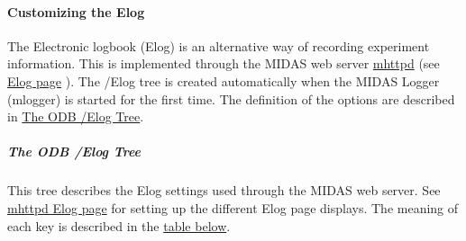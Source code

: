 \par
 

 \par
\hypertarget{F_Elog_F_Elog_Custom}{}\paragraph{Customizing the Elog}\label{F_Elog_F_Elog_Custom}
The Electronic logbook (Elog) is an alternative way of recording experiment information. This is implemented through the MIDAS web server \hyperlink{RC_mhttpd_utility}{mhttpd} (see \hyperlink{RC_mhttpd_Elog_page}{Elog page} ). The /Elog tree is created automatically when the MIDAS Logger (mlogger) is started for the first time. The definition of the options are described in \hyperlink{F_Elog_F_ODB_Elog_Tree}{The ODB /Elog Tree}.

\label{F_Elog_idx_ODB_tree_Elog}
\hypertarget{F_Elog_idx_ODB_tree_Elog}{}
 \hypertarget{F_Elog_F_ODB_Elog_Tree}{}\subparagraph{The ODB /Elog Tree}\label{F_Elog_F_ODB_Elog_Tree}
This tree describes the Elog settings used through the MIDAS web server. See \hyperlink{RC_mhttpd_Elog_page}{mhttpd Elog page} for setting up the different Elog page displays. The meaning of each key is described in the \hyperlink{F_Elog_F_ODB_Elog_Tree_Keys}{table below}.


